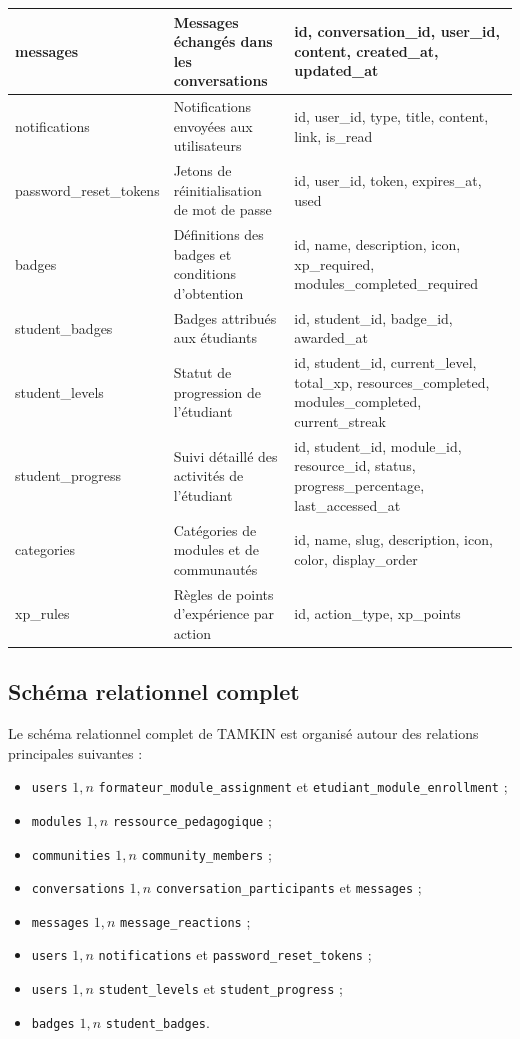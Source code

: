 \documentclass[12pt,a4paper,oneside]{report}
\begin{document}
\begin{longtable}{|p{3.4cm}|p{4.4cm}|p{4.4cm}|}
messages & Messages échangés dans les conversations & id, conversation\_id, user\_id, content, created\_at, updated\_at \\
\hline
notifications & Notifications envoyées aux utilisateurs & id, user\_id, type, title, content, link, is\_read \\
\hline
password\_reset\_tokens & Jetons de réinitialisation de mot de passe & id, user\_id, token, expires\_at, used \\
\hline
badges & Définitions des badges et conditions d'obtention & id, name, description, icon, xp\_required, modules\_completed\_required \\
\hline
student\_badges & Badges attribués aux étudiants & id, student\_id, badge\_id, awarded\_at \\
\hline
student\_levels & Statut de progression de l'étudiant & id, student\_id, current\_level, total\_xp, resources\_completed, modules\_completed, current\_streak \\
\hline
student\_progress & Suivi détaillé des activités de l'étudiant & id, student\_id, module\_id, resource\_id, status, progress\_percentage, last\_accessed\_at \\
\hline
categories & Catégories de modules et de communautés & id, name, slug, description, icon, color, display\_order \\
\hline
xp\_rules & Règles de points d'expérience par action & id, action\_type, xp\_points \\
\hline
\end{longtable}

\subsection{Schéma relationnel complet}

Le schéma relationnel complet de TAMKIN est organisé autour des relations principales suivantes :
\begin{itemize}
  \item \texttt{users} \(1,n\) \texttt{formateur\_module\_assignment} et \texttt{etudiant\_module\_enrollment} ;
  \item \texttt{modules} \(1,n\) \texttt{ressource\_pedagogique} ;
  \item \texttt{communities} \(1,n\) \texttt{community\_members} ;
  \item \texttt{conversations} \(1,n\) \texttt{conversation\_participants} et \texttt{messages} ;
  \item \texttt{messages} \(1,n\) \texttt{message\_reactions} ;
  \item \texttt{users} \(1,n\) \texttt{notifications} et \texttt{password\_reset\_tokens} ;
  \item \texttt{users} \(1,n\) \texttt{student\_levels} et \texttt{student\_progress} ;
  \item \texttt{badges} \(1,n\) \texttt{student\_badges}.
\end{itemize}
\end{document}
